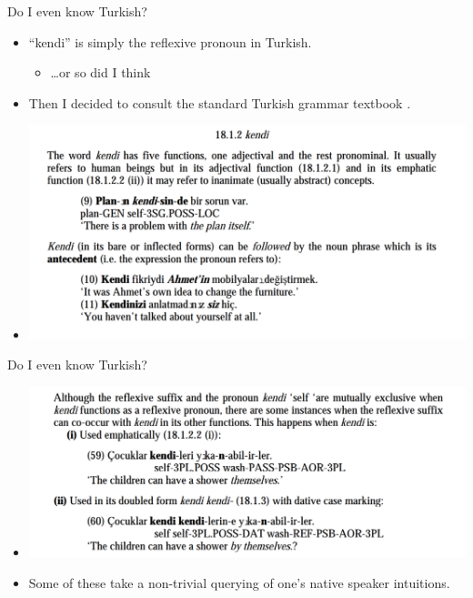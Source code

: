\documentclass{beamer}
\begin{document}
  \begin{frame}{Do I even know Turkish?}
    \begin{itemize}
      \item<1-> ``kendi'' is simply the reflexive pronoun in Turkish.
        \begin{itemize}
          \item<2-> \dots or so did I think
        \end{itemize}
      \item<3-> Then I decided to consult the standard Turkish grammar
        textbook \cite{goksel2004turkish}.
      \item<4->
        \begin{center}
          \includegraphics[scale=0.3]{resources/kendi-functions.png}
         \end{center}
    \end{itemize}
  \end{frame}

  \begin{frame}{Do I even know Turkish?}
    \begin{itemize}
      \item<1-> \includegraphics[scale=0.3]{resources/kendi-exceptions.png}
      \item<2-> Some of these take a non-trivial querying of one's native
        speaker intuitions.
    \end{itemize}
  \end{frame}
\end{document}
